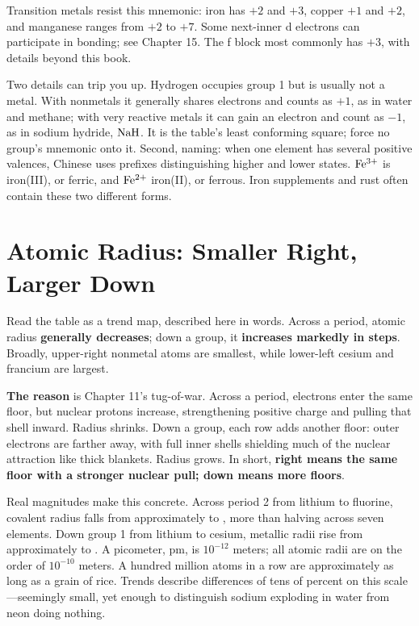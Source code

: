 Transition metals resist this mnemonic: iron has $+2$ and $+3$, copper $+1$ and $+2$, and manganese ranges from $+2$ to $+7$. Some next-inner d electrons can participate in bonding; see Chapter 15. The f block most commonly has $+3$, with details beyond this book.

Two details can trip you up. Hydrogen occupies group 1 but is usually not a metal. With nonmetals it generally shares electrons and counts as $+1$, as in water and methane; with very reactive metals it can gain an electron and count as $-1$, as in sodium hydride, $\mathrm{NaH}$. It is the table's least conforming square; force no group's mnemonic onto it. Second, naming: when one element has several positive valences, Chinese uses prefixes distinguishing higher and lower states. $\mathrm{Fe^{3+}}$ is iron(III), or ferric, and $\mathrm{Fe^{2+}}$ iron(II), or ferrous. Iron supplements and rust often contain these two different forms.

\section{Atomic Radius: Smaller Right, Larger Down}

Read the table as a trend map, described here in words. Across a period, atomic radius \textbf{generally decreases}; down a group, it \textbf{increases markedly in steps}. Broadly, upper-right nonmetal atoms are smallest, while lower-left cesium and francium are largest.

\textbf{The reason} is Chapter 11's tug-of-war. Across a period, electrons enter the same floor, but nuclear protons increase, strengthening positive charge and pulling that shell inward. Radius shrinks. Down a group, each row adds another floor: outer electrons are farther away, with full inner shells shielding much of the nuclear attraction like thick blankets. Radius grows. In short, \textbf{right means the same floor with a stronger nuclear pull; down means more floors}.

Real magnitudes make this concrete. Across period 2 from lithium to fluorine, covalent radius falls from approximately  to , more than halving across seven elements. Down group 1 from lithium to cesium, metallic radii rise from approximately  to . A picometer, pm, is $10^{-12}$ meters; all atomic radii are on the order of $10^{-10}$ meters. A hundred million atoms in a row are approximately as long as a grain of rice. Trends describe differences of tens of percent on this scale---seemingly small, yet enough to distinguish sodium exploding in water from neon doing nothing.


